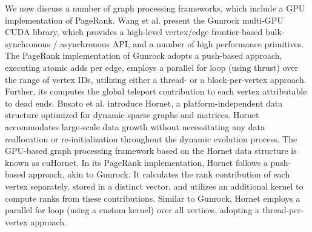We now discuss a number of graph processing frameworks, which include a GPU implementation of PageRank. Wang et al. \cite{wang2016gunrock} present the Gunrock multi-GPU CUDA library, which provides a high-level vertex/edge frontier-based bulk-synchronous / asynchronous API, and a number of high performance primitives. The PageRank implementation of Gunrock adopts a push-based approach, executing atomic adds per edge, employs a parallel for loop (using thrust) over the range of vertex IDs, utilizing either a thread- or a block-per-vertex approach. Further, its computes the global teleport contribution to each vertex attributable to dead ends. Busato et al. \cite{busato2018hornet} introduce Hornet, a platform-independent data structure optimized for dynamic sparse graphs and matrices. Hornet accommodates large-scale data growth without necessitating any data reallocation or re-initialization throughout the dynamic evolution process. The GPU-based graph processing framework based on the Hornet data structure is known as cuHornet. In its PageRank implementation, Hornet follows a push-based approach, akin to Gunrock. It calculates the rank contribution of each vertex separately, stored in a distinct vector, and utilizes an additional kernel to compute ranks from these contributions. Similar to Gunrock, Hornet employs a parallel for loop (using a custom kernel) over all vertices, adopting a thread-per-vertex approach.


